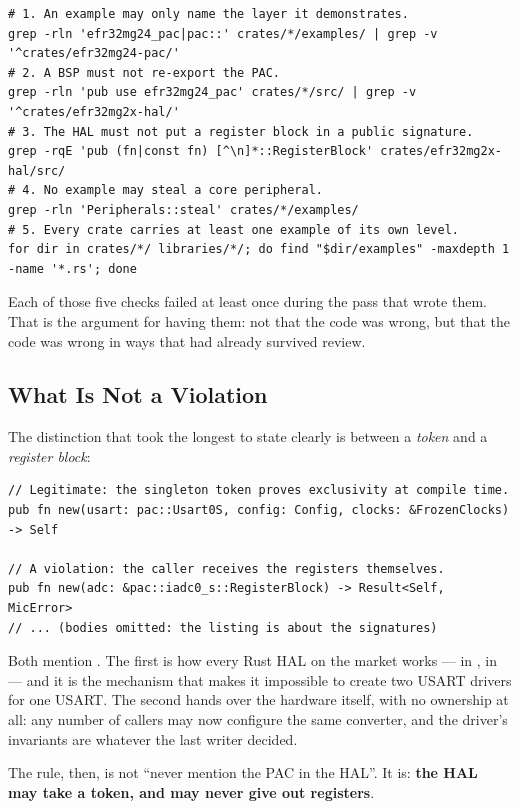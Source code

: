 \begin{verbatim}
# 1. An example may only name the layer it demonstrates.
grep -rln 'efr32mg24_pac|pac::' crates/*/examples/ | grep -v '^crates/efr32mg24-pac/'
# 2. A BSP must not re-export the PAC.
grep -rln 'pub use efr32mg24_pac' crates/*/src/ | grep -v '^crates/efr32mg2x-hal/'
# 3. The HAL must not put a register block in a public signature.
grep -rqE 'pub (fn|const fn) [^\n]*::RegisterBlock' crates/efr32mg2x-hal/src/
# 4. No example may steal a core peripheral.
grep -rln 'Peripherals::steal' crates/*/examples/
# 5. Every crate carries at least one example of its own level.
for dir in crates/*/ libraries/*/; do find "$dir/examples" -maxdepth 1 -name '*.rs'; done
\end{verbatim}

Each of those five checks failed at least once during the pass that wrote them. That is the
argument for having them: not that the code was wrong, but that the code was wrong in ways that
had already survived review.

\subsection{What Is Not a Violation}

The distinction that took the longest to state clearly is between a \emph{token} and a
\emph{register block}:

\begin{verbatim}
// Legitimate: the singleton token proves exclusivity at compile time.
pub fn new(usart: pac::Usart0S, config: Config, clocks: &FrozenClocks) -> Self

// A violation: the caller receives the registers themselves.
pub fn new(adc: &pac::iadc0_s::RegisterBlock) -> Result<Self, MicError>
// ... (bodies omitted: the listing is about the signatures)
\end{verbatim}

Both mention . The first is how every Rust HAL on the market works —
 in ,  in
 — and it is the mechanism that makes it impossible to create two USART
drivers for one USART. The second hands over the hardware itself, with no ownership at all: any
number of callers may now configure the same converter, and the driver's invariants are whatever
the last writer decided.

The rule, then, is not ``never mention the PAC in the HAL''. It is: \textbf{the HAL may take a
token, and may never give out registers}.

